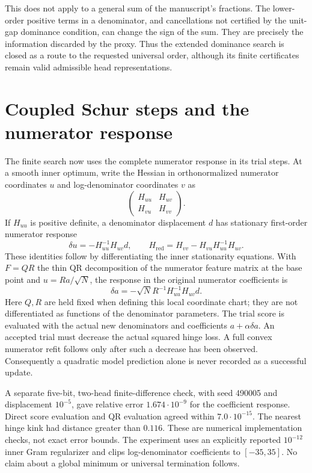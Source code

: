 \documentclass[11pt]{article}
\begin{document}
This does not apply to a general sum of the manuscript's fractions.
The lower-order positive terms in a denominator, and cancellations
not certified by the unit-gap dominance condition, can change the
sign of the sum. They are precisely the information discarded by
the proxy. Thus the extended dominance search is closed as a route
to the requested universal order, although its finite certificates
remain valid admissible head representations.


\section{Coupled Schur steps and the numerator response}

The finite search now uses the complete numerator response in its trial
steps. At a smooth inner optimum, write the Hessian in orthonormalized
numerator coordinates $u$ and log-denominator coordinates $v$ as
\[
 \begin{pmatrix}H_{uu}&H_{uv}\\H_{vu}&H_{vv}\end{pmatrix}.
\]
If $H_{uu}$ is positive definite, a denominator displacement $d$ has
stationary first-order numerator response
\[
 \delta u=-H_{uu}^{-1}H_{uv}d,
 \qquad
 H_{\mathrm{red}}=H_{vv}-H_{vu}H_{uu}^{-1}H_{uv}.
\]
These identities follow by differentiating the inner stationarity
equations. With $F=QR$ the thin QR decomposition of the numerator
feature matrix at the base point and $u=Ra/\sqrt N$, the response in the original
numerator coefficients is
\[
 \delta a=-\sqrt N R^{-1}H_{uu}^{-1}H_{uv}d.
\]
Here $Q,R$ are held fixed when defining this local coordinate chart;
they are not differentiated as functions of the denominator parameters.
The trial score is evaluated with the actual new denominators and
coefficients $a+\alpha\delta a$. An accepted trial must decrease the
actual squared hinge loss. A full convex numerator refit follows only
after such a decrease has been observed. Consequently a quadratic
model prediction alone is never recorded as a successful update.

A separate five-bit, two-head finite-difference check, with seed
490005 and displacement $10^{-5}$, gave relative error
$1.674\cdot10^{-9}$ for the coefficient response. Direct score
evaluation and QR evaluation agreed within $7.0\cdot10^{-15}$.
The nearest hinge kink had distance greater than $0.116$.
These are numerical implementation checks, not exact error bounds.
The experiment uses an explicitly reported $10^{-12}$ inner Gram
regularizer and clips log-denominator coefficients to $[-35,35]$.
No claim about a global minimum or universal termination follows.
\end{document}
